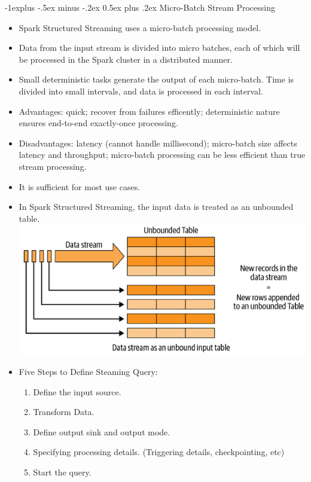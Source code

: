 \documentclass[10pt, landscape]{article}
\makeatletter
\renewcommand{\subsection}{\@startsection{subsection}{2}{0mm}%
  {-1explus -.5ex minus -.2ex}%
  {0.5ex plus .2ex}%
{\normalfont\normalsize\bfseries}}
\makeatother
\begin{document}
\begin{multicols*}{4}
  \subsection{Micro-Batch Stream Processing}
  \begin{itemize}
    \item Spark Structured Streaming uses a micro-batch processing model.
    \item Data from the input stream is divided into micro batches, each of which will be processed in the Spark cluster in a distributed manner.
    \item Small deterministic tasks generate the output of each micro-batch. Time is divided into small intervals, and data is processed in each interval.
    \item Advantages: quick; recover from failures efficently; deterministic nature ensures end-to-end exactly-once processing.
    \item Disadvantages: latency (cannot handle millisecond); micro-batch size affects latency and throughput; micro-batch processing can be less efficient than true stream processing.
    \item It is sufficient for most use cases.
    \item In Spark Structured Streaming, the input data is treated as an unbounded table. \includegraphics[width=0.95\linewidth]{spark_stream_unbound_table.png}
    \item Five Steps to Define Steaming Query: 
          \begin{enumerate}
            \item Define the input source.
            \item Transform Data.
            \item Define output sink and output mode.
            \item Specifying processing details. (Triggering details, checkpointing, etc)
            \item Start the query.
          \end{enumerate}
  \end{itemize}


\end{multicols*}
\end{document}
